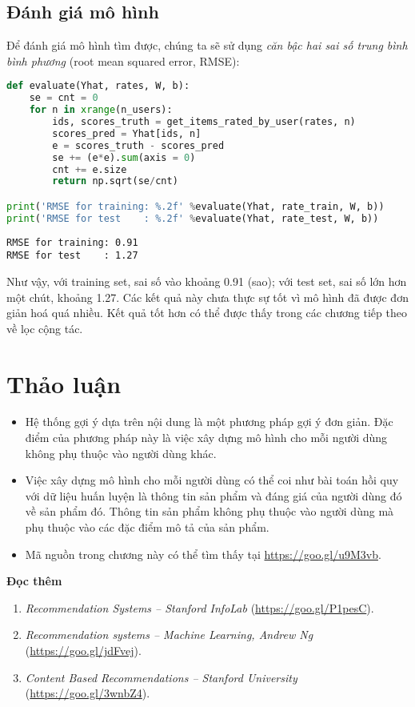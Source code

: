 \subsection{Đánh giá mô hình}
Để đánh giá mô hình tìm được, chúng ta sẽ sử dụng \textit{căn bậc hai sai số trung bình bình phương} (root mean squared error, RMSE):
\begin{lstlisting}[language=Python]
def evaluate(Yhat, rates, W, b):
    se = cnt = 0
    for n in xrange(n_users):
        ids, scores_truth = get_items_rated_by_user(rates, n)
        scores_pred = Yhat[ids, n]
        e = scores_truth - scores_pred
        se += (e*e).sum(axis = 0)
        cnt += e.size
        return np.sqrt(se/cnt)

print('RMSE for training: %.2f' %evaluate(Yhat, rate_train, W, b))
print('RMSE for test    : %.2f' %evaluate(Yhat, rate_test, W, b))
\end{lstlisting}
\kq
\begin{lstlisting}
RMSE for training: 0.91
RMSE for test    : 1.27
\end{lstlisting}


Như vậy, với training set, sai số vào khoảng 0.91 (sao); với test set, sai số
lớn hơn một chút, khoảng 1.27. Các kết quả này chưa thực sự tốt
vì mô hình đã được đơn giản hoá quá nhiều. Kết quả tốt hơn có thể được thấy
trong các chương tiếp theo về lọc cộng tác.


\section{Thảo luận}

\begin{itemize}
\item Hệ thống gợi ý dựa trên nội dung là một phương pháp gợi ý đơn giản. Đặc điểm của phương pháp này là việc xây dựng mô hình cho mỗi người dùng không phụ thuộc vào người dùng khác.

\item Việc xây dựng mô hình cho mỗi người dùng có thể coi như bài
toán hồi quy với dữ liệu huấn luyện là thông tin sản phẩm và đáng giá của người dùng đó về sản phẩm đó. Thông tin sản phẩm không phụ thuộc vào người dùng mà phụ thuộc vào các đặc điểm mô tả của sản phẩm.

\item Mã nguồn trong chương này có thể tìm thấy tại
\url{https://goo.gl/u9M3vb}.
\end{itemize}



\textbf{Đọc thêm}
\begin{enumerate}
\item \textit{Recommendation Systems -- Stanford InfoLab}
(\url{https://goo.gl/P1pesC}).

\item \textit{Recommendation systems -- Machine Learning, Andrew Ng}
(\url{https://goo.gl/jdFvej}).


\item \textit{Content Based Recommendations -- Stanford University}
(\url{https://goo.gl/3wnbZ4}).
\end{enumerate}
